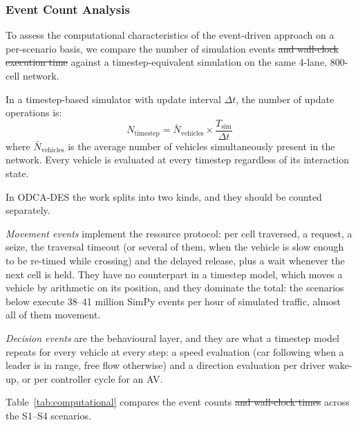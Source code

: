 \documentclass[review,number]{elsarticle} %
\providecommand{\DIFdeltex}[1]{{\protect\color{red}\sout{#1}}}                      %
\providecommand{\DIFdelbegin}{} %
\providecommand{\DIFdelend}{} %
\providecommand{\DIFdel}[1]{\texorpdfstring{\DIFdeltex{#1}}{}} %
\newcommand{\DIFscaledelfig}{0.5}
\newlength{\DIFdelgraphicswidth} %
\newlength{\DIFdelgraphicsheight} %
\newcommand{\DIFdelincludegraphics}[2][]{%
\sbox{\DIFdelgraphicsbox}{\DIFOincludegraphics[#1]{#2}}%
\settoboxwidth{\DIFdelgraphicswidth}{\DIFdelgraphicsbox} %
\settoboxtotalheight{\DIFdelgraphicsheight}{\DIFdelgraphicsbox} %
\scalebox{\DIFscaledelfig}{%
\parbox[b]{\DIFdelgraphicswidth}{\usebox{\DIFdelgraphicsbox}\\[-\baselineskip] \rule{\DIFdelgraphicswidth}{0em}}\llap{\resizebox{\DIFdelgraphicswidth}{\DIFdelgraphicsheight}{%
\setlength{\unitlength}{\DIFdelgraphicswidth}%
\begin{picture}(1,1)%
\thicklines\linethickness{2pt} %
{\color[rgb]{1,0,0}\put(0,0){\framebox(1,1){}}}%
{\color[rgb]{1,0,0}\put(0,0){\line( 1,1){1}}}%
{\color[rgb]{1,0,0}\put(0,1){\line(1,-1){1}}}%
\end{picture}%
}\hspace*{3pt}}} %
} %
\DeclareRobustCommand{\DIFdelbegin}{\DIFOdelbegin \let\includegraphics\DIFdelincludegraphics} %
\DeclareRobustCommand{\DIFdelend}{\DIFOaddend \let\includegraphics\DIFOincludegraphics} %
\begin{document}
\subsubsection{Event Count Analysis}
\label{sec:exp_event_count}

To assess the computational characteristics of the event-driven approach on a per-scenario basis, we compare the number of simulation events \DIFdelbegin \DIFdel{and wall-clock execution time }\DIFdelend against a timestep-equivalent simulation on the same 4-lane, 800-cell network.

In a timestep-based simulator with update interval $\Delta t$, the number of update operations is:
\begin{equation}
    N_{\text{timestep}} = \bar{N}_{\text{vehicles}} \times \frac{T_{\text{sim}}}{\Delta t}
    \label{eq:timestep_count}
\end{equation}
where $\bar{N}_{\text{vehicles}}$ is the average number of vehicles simultaneously present in the network. Every vehicle is evaluated at every timestep regardless of its interaction state.

In ODCA-DES the work splits into two kinds, and they should be counted separately.

\emph{Movement events} implement the resource protocol: per cell traversed, a request, a seize, the traversal timeout (or several of them, when the vehicle is slow enough to be re-timed while crossing) and the delayed release, plus a wait whenever the next cell is held. They have no counterpart in a timestep model, which moves a vehicle by arithmetic on its position, and they dominate the total: the scenarios below execute 38--41 million SimPy events per hour of simulated traffic, almost all of them movement.

\emph{Decision events} are the behavioural layer, and they are what a timestep model repeats for every vehicle at every step: a speed evaluation (car following when a leader is in range, free flow otherwise) and a direction evaluation per driver wake-up, or per controller cycle for an AV.

Table~\ref{tab:computational} compares the event counts \DIFdelbegin \DIFdel{and wall-clock times }\DIFdelend across the S1--S4 scenarios.
\end{document}
